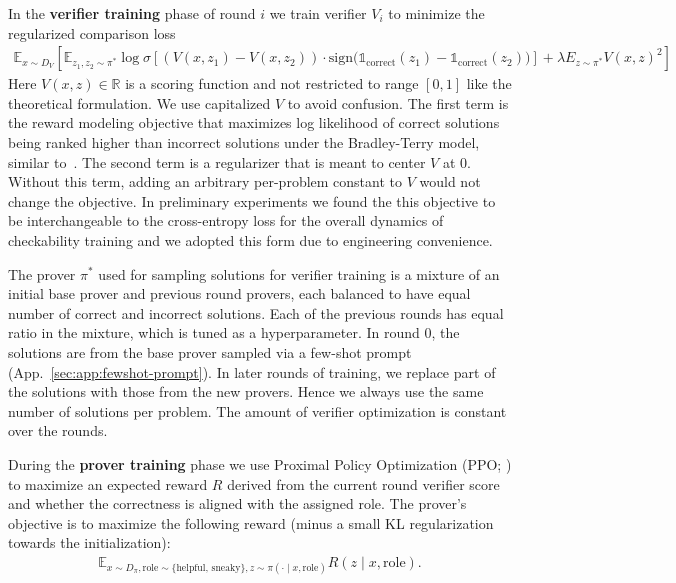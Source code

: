 \documentclass{article}
\newcommand{\indcor}[1]{\mathds{1}_{\text{correct}}\left({#1}\right)}
\newcommand{\sign}[1]{\text{sign}{#1}}
\begin{document}
In the \textbf{verifier training} phase of round $i$ we train verifier $V_i$ to minimize the regularized comparison loss
\begin{align*}
\mathbb{E}_{x \sim D_V} \left[\mathbb{E}_{z_1,z_2\sim \pi^*} \log \sigma \left[\left(V(x, z_1)-V(x,z_2)\right) \cdot \sign (\indcor{z_1} - \indcor{z_2})\right] + \lambda E_{z\sim \pi^*} V(x, z)^2 \right]
\end{align*}
Here $V(x, z) \in \mathbb{R}$ is a scoring function and not restricted to range $[0, 1]$ like the theoretical formulation. We use capitalized $V$ to avoid confusion. The first term is the reward modeling objective that maximizes log likelihood of correct solutions being ranked higher than incorrect solutions under the Bradley-Terry model, similar to~\citet{ouyang2022training}. The second term is a regularizer that is meant to center $V$ at $0$. 
Without this term, adding an arbitrary per-problem constant to $V$ would not change the objective. In preliminary experiments we found the this objective to be interchangeable to the cross-entropy loss for the overall dynamics of checkability training and we adopted this form due to engineering convenience.

The prover $\pi^*$ used for sampling solutions for verifier training is a mixture of an initial base prover and previous round provers, each balanced to have equal number of correct and incorrect solutions. Each of the previous rounds has equal ratio in the mixture, which is tuned as a hyperparameter. 
In round 0, the solutions are from the base prover sampled via a few-shot prompt (App.~\ref{sec:app:fewshot-prompt}). In later rounds of training, we replace part of the solutions with those from the new provers. Hence we always use the same number of solutions per problem. The amount of verifier optimization is constant over the rounds.

During the \textbf{prover training} phase we use Proximal Policy Optimization (PPO; \citeauthor{schulman2017proximal} \citeyear{schulman2017proximal}) to maximize an expected reward $R$ derived from the current round verifier score and whether the correctness is aligned with the assigned role. The prover's objective is to maximize the following reward (minus a small KL regularization towards the initialization):
\begin{align*}
\mathbb{E}_{x \sim D_{\pi}, \text{role} \sim \{\text{helpful, sneaky}\}, z \sim \pi(\cdot \mid x, \text{role})} R(z \mid x, \text{role}).
\end{align*}
\end{document}
